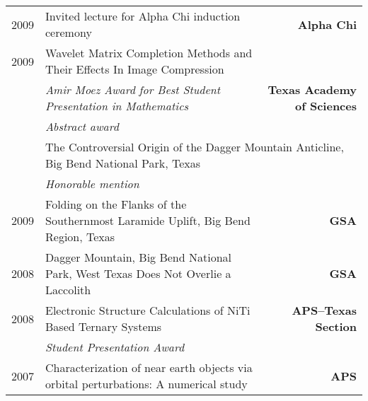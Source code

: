 \documentclass[10pt,letterpaper,english]{moderncv}
\begin{document}
\begin{tabularx}{\textwidth}{p{.35in}X>{\bfseries}r}
	 2009 & Invited lecture for Alpha Chi induction ceremony & Alpha Chi  \\
	 
	 2009 & Wavelet Matrix Completion Methods and Their Effects In Image Compression &  \\
	  & \emph{Amir Moez Award for Best Student Presentation in Mathematics} & Texas Academy of Sciences \\
	  & \emph{Abstract award} & \\
	  & \multicolumn{2}{l}{The Controversial Origin of the Dagger Mountain Anticline, Big Bend National Park, Texas}  \\
	  & \emph{Honorable mention} & \\
	  
	  
	  2009 & Folding on the Flanks of the Southernmost Laramide Uplift, Big Bend Region, Texas & GSA \\[1em]
	  
	  2008 & Dagger Mountain, Big Bend National Park, West Texas Does Not Overlie a Laccolith & GSA \\[1em]
	 
	 2008 & Electronic Structure Calculations of NiTi Based Ternary Systems  & APS--Texas Section \\
	 & \emph{Student Presentation Award} & \\
	 
	 2007 & Characterization of near earth objects via orbital perturbations: A numerical study & APS \\
	 
\end{tabularx}





\end{document}
